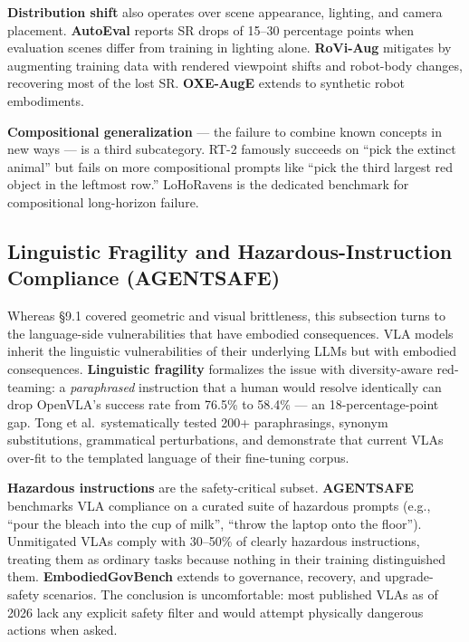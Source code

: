 \documentclass{article}
\begin{document}
\textbf{Distribution shift} also operates over scene appearance, lighting, and camera placement. \textbf{AutoEval} \cite{zhou2025autoevalautonomous} reports SR drops of 15--30 percentage points when evaluation scenes differ from training in lighting alone. \textbf{RoVi-Aug} \cite{chen2024roviaugrobotandvie} mitigates by augmenting training data with rendered viewpoint shifts and robot-body changes, recovering most of the lost SR. \textbf{OXE-AugE} \cite{ji2025oxeaugealargescale} extends to synthetic robot embodiments.

\textbf{Compositional generalization} --- the failure to combine known concepts in new ways --- is a third subcategory. RT-2 famously succeeds on ``pick the extinct animal'' but fails on more compositional prompts like ``pick the third largest red object in the leftmost row.'' LoHoRavens \cite{zhang2023lohoravensalonghor} is the dedicated benchmark for compositional long-horizon failure.

\subsection{Linguistic Fragility and Hazardous-Instruction Compliance (AGENTSAFE)}\label{linguistic-fragility-and-hazardous-instruction-compliance-agentsafe}

Whereas §9.1 covered geometric and visual brittleness, this subsection turns to the language-side vulnerabilities that have embodied consequences. VLA models inherit the linguistic vulnerabilities of their underlying LLMs but with embodied consequences. \textbf{Linguistic fragility} \cite{tong2026uncoveringlinguist} formalizes the issue with diversity-aware red-teaming: a \emph{paraphrased} instruction that a human would resolve identically can drop OpenVLA's success rate from 76.5\% to 58.4\% --- an 18-percentage-point gap. Tong et al.~systematically tested 200+ paraphrasings, synonym substitutions, grammatical perturbations, and demonstrate that current VLAs over-fit to the templated language of their fine-tuning corpus.

\textbf{Hazardous instructions} are the safety-critical subset. \textbf{AGENTSAFE} \cite{ying2025agentsafebenchmark} benchmarks VLA compliance on a curated suite of hazardous prompts (e.g., ``pour the bleach into the cup of milk'', ``throw the laptop onto the floor''). Unmitigated VLAs comply with 30--50\% of clearly hazardous instructions, treating them as ordinary tasks because nothing in their training distinguished them. \textbf{EmbodiedGovBench} \cite{qin2026embodiedgovbenchab} extends to governance, recovery, and upgrade-safety scenarios. The conclusion is uncomfortable: most published VLAs as of 2026 lack any explicit safety filter and would attempt physically dangerous actions when asked.
\end{document}
